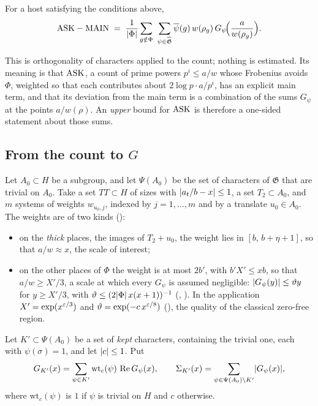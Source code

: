 \begin{statement}\label{st:balance}
For a host satisfying the conditions above,
\[
\ASK-\MAIN\;=\;\frac1{\abs\Phi}\sum_{g\notin\Phi}\ \sum_{\psi\in\widehat{\mathfrak G}}
\overline{\psi}(g)\,w(\rho_g)\,G_\psi\!\Bigl(\frac{a}{w(\rho_g)}\Bigr).
\]
\end{statement}
This is orthogonality of characters applied to the count; nothing is estimated. Its meaning is
that $\mathrm{ASK}$, a count of prime powers $p^i\le a/w$ whose Frobenius avoids $\Phi$, weighted so
that each contributes about $2\log p\cdot a/p^i$, has an explicit main term, and that its deviation from the
main term is a combination of the sums $G_\psi$ at the points $a/w(\rho)$. An \emph{upper}
bound for $\mathrm{ASK}$ is therefore a one-sided statement about those sums.

\subsection{From the count to $G$}\label{sec:reduction}
Let $A_0\subset H$ be a subgroup, and let $\Psi(A_0)$ be the set of characters of
$\mathfrak G$ that are trivial on $A_0$. Take a set $TT\subset H$ of sizes with
$\lvert a_t/b-x\rvert\le1$, a set $T_2\subset A_0$, and $m$ systems of weights
$w_{u_0,j}$, indexed by $j=1,\dots,m$ and by a translate $u_0\in A_0$. The weights are of two
kinds \lvS{} ():
\begin{itemize}
\item on the \emph{thick} places, the images of $T_2+u_0$, the weight lies in $[b,\,b+\eta+1]$,
  so that $a/w\approx x$, the scale of interest;
\item on the other places of $\Phi$ the weight is at most $2b'$, with $b'X'\le xb$, so that
  $a/w\ge X'/3$, a scale at which every $G_\psi$ is assumed negligible:
  $\lvert G_\psi(y)\rvert\le\vartheta y$ for $y\ge X'/3$, with $\vartheta\le(2\lvert \Phi\rvert\,x(x+1))^{-1}$
  (, ). In the application $X'=\exp(x^{\varepsilon/3})$ and
  $\vartheta=\exp(-c\,x^{\varepsilon/8})$ \lvS{} (), the quality of the classical
  zero-free region.
\end{itemize}
Let $K'\subset\Psi(A_0)$ be a set of \emph{kept} characters, containing the trivial one, each
with $\psi(\sigma)=1$, and let $\lvert c\rvert\le1$. Put
\[
G_{K'}(x)=\sum_{\psi\in K'}\mathrm{wt}_c(\psi)\,\operatorname{Re} G_\psi(x),\qquad
\Sigma_{K'}(x)=\sum_{\psi\in\Psi(A_0)\setminus K'}\lvert G_\psi(x)\rvert,
\]
where $\mathrm{wt}_c(\psi)$ is $1$ if $\psi$ is trivial on $H$ and $c$ otherwise.

